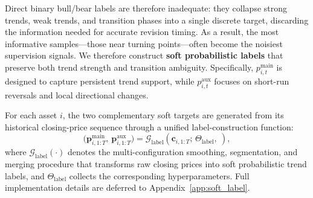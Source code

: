 \documentclass[letterpaper]{article} %
\begin{document}
Direct binary bull/bear labels \citep{Qin2023EarnHFTEH} are therefore inadequate: they collapse strong trends, weak trends, and transition phases into a single discrete target, discarding the information needed for accurate revision timing. As a result, the most informative samples—those near turning points—often become the noisiest supervision signals. We therefore construct \textbf{soft probabilistic labels} that preserve both trend strength and transition ambiguity. Specifically, \(p^{\mathrm{main}}_{i,t}\) is designed to capture persistent trend support, while \(p^{\mathrm{aux}}_{i,t}\) focuses on short-run reversals and local directional changes.

For each asset \(i\), the two complementary soft targets are generated from its historical closing-price sequence through a unified label-construction function:
\[
\bigl(\mathbf{p}^{\mathrm{main}}_{i,1:T},\,\mathbf{p}^{\mathrm{aux}}_{i,1:T}\bigr)
=
\mathcal{G}_{\mathrm{label}}
\!\left(
\mathbf{c}_{i,1:T};\,\Theta_{\mathrm{label}},\
\right),
\]
where \(\mathcal{G}_{\mathrm{label}}(\cdot)\) denotes the multi-configuration smoothing, segmentation, and merging procedure that transforms raw closing prices into soft probabilistic trend labels, and \(\Theta_{\mathrm{label}}\) collects the corresponding hyperparameters. Full implementation details are deferred to Appendix~\ref{app:soft_label}.
\end{document}
